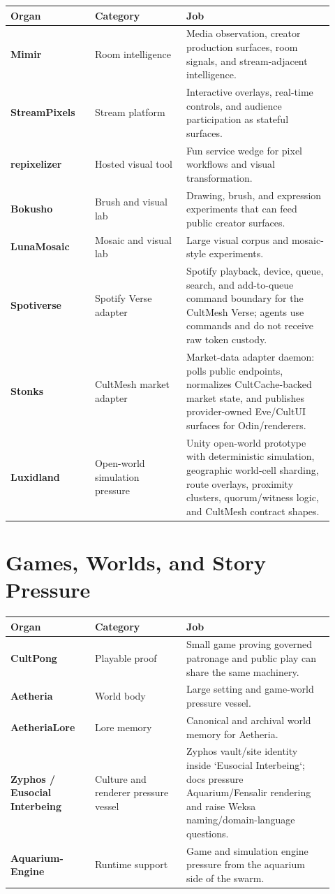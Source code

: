 \documentclass[11pt,oneside]{article}
\newcommand{\Organ}[3]{\textbf{#1} & #2 & #3\\}
\begin{document}
\begin{longtable}{>{\bfseries}p{0.24\linewidth}p{0.26\linewidth}p{0.42\linewidth}}
\toprule
Organ & Category & Job\\
\midrule
\Organ{Mimir}{Room intelligence}{Media observation, creator production surfaces, room signals, and stream-adjacent intelligence.}
\Organ{StreamPixels}{Stream platform}{Interactive overlays, real-time controls, and audience participation as stateful surfaces.}
\Organ{repixelizer}{Hosted visual tool}{Fun service wedge for pixel workflows and visual transformation.}
\Organ{Bokusho}{Brush and visual lab}{Drawing, brush, and expression experiments that can feed public creator surfaces.}
\Organ{LunaMosaic}{Mosaic and visual lab}{Large visual corpus and mosaic-style experiments.}
\Organ{Spotiverse}{Spotify Verse adapter}{Spotify playback, device, queue, search, and add-to-queue command boundary for the CultMesh Verse; agents use commands and do not receive raw token custody.}
\Organ{Stonks}{CultMesh market adapter}{Market-data adapter daemon: polls public endpoints, normalizes CultCache-backed market state, and publishes provider-owned Eve/CultUI surfaces for Odin/renderers.}
\Organ{Luxidland}{Open-world simulation pressure}{Unity open-world prototype with deterministic simulation, geographic world-cell sharding, route overlays, proximity clusters, quorum/witness logic, and CultMesh contract shapes.}
\bottomrule
\end{longtable}

\section{Games, Worlds, and Story Pressure}

\begin{longtable}{>{\bfseries}p{0.24\linewidth}p{0.26\linewidth}p{0.42\linewidth}}
\toprule
Organ & Category & Job\\
\midrule
\Organ{CultPong}{Playable proof}{Small game proving governed patronage and public play can share the same machinery.}
\Organ{Aetheria}{World body}{Large setting and game-world pressure vessel.}
\Organ{AetheriaLore}{Lore memory}{Canonical and archival world memory for Aetheria.}
\Organ{Zyphos / Eusocial Interbeing}{Culture and renderer pressure vessel}{Zyphos vault/site identity inside `Eusocial Interbeing`; docs pressure Aquarium/Fensalir rendering and raise Weksa naming/domain-language questions.}
\Organ{Aquarium-Engine}{Runtime support}{Game and simulation engine pressure from the aquarium side of the swarm.}
\bottomrule
\end{longtable}
\end{document}
